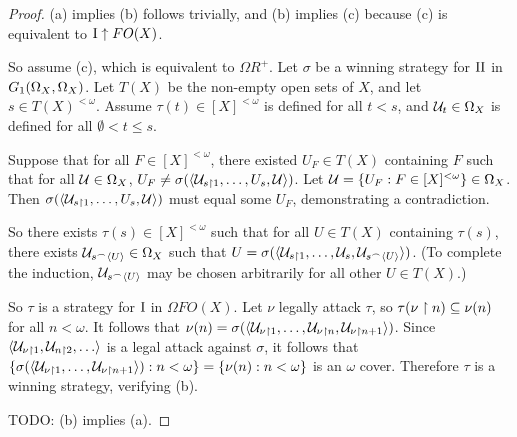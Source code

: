 \documentclass[11pt]{article}
\theoremstyle{plain}
\theoremstyle{definition}
\theoremstyle{remark}
\theoremstyle{plain}
\theoremstyle{definition}
\theoremstyle{remark}
\begin{document}
\begin{proof}
  (a) implies (b) follows trivially, and (b) implies (c) because (c) is
  equivalent to \(\mathrm{I}\uparrow FO(X)\).

  So assume (c), which is equivalent to \(\Omega R^+\). Let \(\sigma\)
  be a winning strategy for \(\mathrm{II}\) in 
  \(G_{1}(\Omega_X,\Omega_X)\). Let \(T(X)\) be the non-empty
  open sets of \(X\), and let \(s\in T(X)^{<\omega}\).
  Assume \(\tau(t)\in[X]^{<\omega}\) is defined for all \(t<s\),
  and \(\mathcal{U}_t\in\Omega_X\) is defined for all 
  \(\emptyset<t\leq s\). 

  Suppose that for all \(F\in[X]^{<\omega}\), there existed \(U_F\in T(X)\)
  containing \(F\) such that for all \(\mathcal{U}\in\Omega_X\),
  \(U_F\not=\sigma(\langle\mathcal{U}_{s\restriction 1},\dots,U_s,\mathcal{U}\rangle)\).
  Let \(\mathcal{U}=\{U_F:F\in[X]^{<\omega}\}\in\Omega_X\).
  Then \(\sigma(\langle\mathcal{U}_{s\restriction 1},\dots,U_s,\mathcal{U}\rangle)\)
  must equal some \(U_F\), demonstrating a contradiction.

  So there exists \(\tau(s)\in[X]^{<\omega}\) such that for all \(U\in T(X)\)
  containing \(\tau(s)\),
  there exists \(\mathcal{U}_{s{^\frown}\langle U\rangle}\in\Omega_X\) such that
  \(U=\sigma(\langle\mathcal{U}_{s\restriction 1},\dots,\mathcal{U}_s,\mathcal{U}_{s{^\frown}\langle U\rangle}\rangle)\).
  (To complete the induction, \(\mathcal{U}_{s{^\frown}\langle U\rangle}\) may be chosen
  arbitrarily for all other \(U\in T(X)\).)

  So \(\tau\) is a strategy for \(\mathrm{I}\) in \(\Omega FO(X)\).
  Let \(\nu\) legally attack \(\tau\), so
  \(\tau(\nu\restriction n)\subseteq \nu(n)\) for all \(n<\omega\).
  It follows that 
  \(\nu(n)=\sigma(\langle\mathcal{U}_{\nu\restriction 1},\dots,\mathcal{U}_{\nu\restriction n},\mathcal{U}_{\nu\restriction n+1}\rangle)\).
  Since \(\<\mc U_{\nu\rest 1},\mc U_{n\rest 2},\dots\>\) is a legal attack
  against \(\sigma\), it follows that
  \(\{\sigma(\langle\mathcal{U}_{\nu\restriction 1},\dots,\mathcal{U}_{\nu\restriction n+1}\rangle):n<\omega\}=\{\nu(n):n<\omega\}\)
  is an \(\omega\) cover. Therefore \(\tau\) is a winning strategy, verifying (b).

  TODO: (b) implies (a).
\end{proof}

  
  
\end{document}
